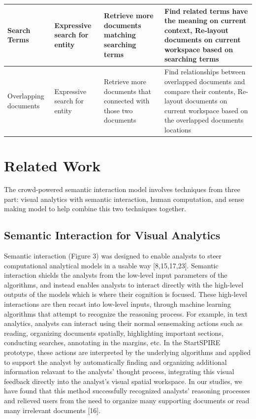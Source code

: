 \documentclass[journal]{vgtc}                %
\begin{document}
\begin{table}[t]
\begin{tabular}{| m{2cm} | m{6cm} | m{4cm} | m{4cm} |}
Search Terms & Expressive search for entity & Retrieve more documents matching searching terms & Find related terms have the meaning on current context, Re-layout documents on current workspace based on searching terms \\ \hline


Overlapping documents
& Expressive search for entity & Retrieve more documents that connected with those two documents & Find relationships between overlapped documents and compare their contents, Re-layout documents on current workspace based on the overlapped documents locations\\ \hline
\end{tabular}
\end{table}

\section{Related Work}
The crowd-powered semantic interaction model involves techniques from three part: visual analytics with semantic interaction, human computation, and sense making model to help combine this two techniques together.

\subsection{Semantic Interaction for Visual Analytics}
Semantic interaction (Figure 3) was designed to enable analysts to steer computational analytical models in a usable way [8,15,17,23].
Semantic interaction shields the analysts from the low-level input parameters of the algorithms, and instead enables analysts to interact directly with the high-level outputs of the models which is where their cognition is focused.
These high-level interactions are then recast into low-level inputs, through machine learning algorithms that attempt to recognize the reasoning process.
For example, in text analytics, analysts can interact using their normal sensemaking actions such as reading, organizing documents spatially, highlighting important sections, conducting searches, annotating in the margins, etc. In the StartSPIRE prototype, these actions are interpreted by the underlying algorithms and applied to support the analyst by automatically finding and organizing additional information relavant to the analysts' thought process, integrating this visual feedback directly into the analyst's visual spatial workspace.
In our studies, we have found that this method successfully recognized analysts’ reasoning processes and relieved users from the need to organize many supporting documents or read many irrelevant documents [16].
\end{document}

